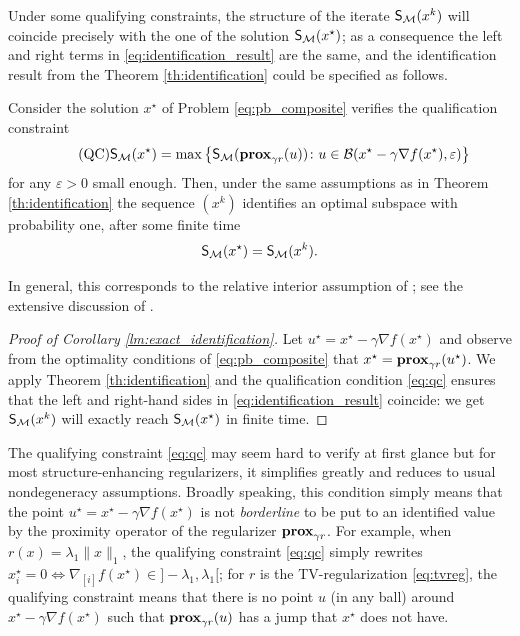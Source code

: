 Under some qualifying constraints, the structure of the iterate $\S(x^k)$ will coincide precisely with the one of the solution $\S(x^\star)$; as a consequence the left and right terms in \eqref{eq:identification_result} are the same, and the identification result from the Theorem \ref{th:identification} could be specified as follows.

\begin{corollary}\label{lm:exact_identification}
Consider the solution $x^\star$ of Problem \eqref{eq:pb_composite} verifies the qualification constraint
\begin{equation}\label{eq:qc}
\tag{QC}
\S(x^\star) = \max\left\{ \S(\prox_{\gamma r}(u))\colon{u\in\mathcal{B}(x^\star - \gamma\nabla f(x^\star),\varepsilon)}\right\}
\end{equation}
for any $\varepsilon >0$ small enough.
Then, under the same assumptions as in Theorem \ref{th:identification}
the sequence $(x^k)$ %
identifies an optimal subspace with probability one, after some finite time
$$
\S(x^\star) = \S(x^k).
$$
\end{corollary}
In general, this corresponds to the relative interior assumption of \cite{lewis2002active}; see the extensive discussion 
of \cite{vaiter2015model}.
\begin{proof}[Proof of Corollary \ref{lm:exact_identification}]
Let $u^\star = x^\star - \gamma \nabla f(x^\star)$ and observe from the optimality conditions of \eqref{eq:pb_composite} that $x^\star = \rprox(u^\star)$. We apply Theorem \ref{th:identification} and the qualification condition \eqref{eq:qc} ensures that the left and right-hand sides in \eqref{eq:identification_result} coincide: we get $\S(x^k)$ will exactly reach $\S(x^\star)$ in finite time.
\end{proof}
\begin{remark}
The qualifying constraint \eqref{eq:qc} may seem hard to verify at first glance but for most structure-enhancing regularizers, it simplifies greatly and {reduces} to usual nondegeneracy {assumptions}. Broadly speaking, this condition simply means that the point $u^\star = x^\star - \gamma\nabla f(x^\star)$ is not \emph{borderline} to be put to an identified value by the proximity operator of the regularizer $\prox_{\gamma r}$. 
For example, {when} $r(x) = \lambda_1 \|x\|_1$, the qualifying constraint \eqref{eq:qc} simply rewrites $x_i^\star = 0 \Leftrightarrow \nabla_{[i]} f(x^\star) \in ]-\lambda_1,\lambda_1[$; 
for $r$ is the TV-regularization \eqref{eq:tvreg}, the qualifying constraint means that there is no point $u$ (in any ball) around $x^\star - \gamma \nabla f(x^\star)$ such that $\prox_{\gamma r}(u)$ has a jump that $x^\star$ does not have. 
\end{remark}
